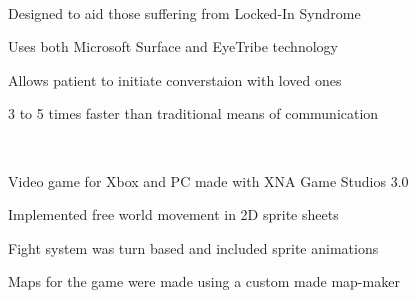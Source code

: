 \documentclass[]{deedy-resume-openfont}
\begin{document}
\begin{minipage}[t]{0.66\textwidth}
\href{https://www.youtube.com/watch?v=mYUiSeqqgDY&list=PLbbCsk7MUIGfXpnd9XN-pBeCd6ixuCQ2X}{} \\
\begin{tightemize}
\item Designed to aid those suffering from Locked-In Syndrome
\item Uses both Microsoft Surface and EyeTribe technology
\item Allows patient to initiate converstaion with loved ones
\item 3 to 5 times faster than traditional means of communication
\end{tightemize}
\sectionsep

\href{https://github.com/jonwho/ScottTheIntern}{} \\
\begin{tightemize}
\item Video game for Xbox and PC made with XNA Game Studios 3.0
\item Implemented free world movement in 2D sprite sheets
\item Fight system was turn based and included sprite animations
\item Maps for the game were made using a custom made map-maker
\end{tightemize}
\sectionsep


\end{minipage}
\end{document}
